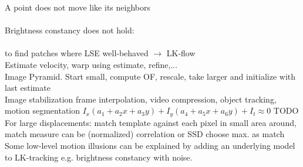 A point does not move like its neighbors \\
\\
Brightness constancy does not hold:\\
 \\
 to find patches where LSE well-behaved $\rightarrow$ LK-flow\\
 Estimate velocity, warp using estimate, refine,...\\
 Image Pyramid. Start small, compute OF, rescale, take larger and initialize with last estimate\\
 Image stabilization  frame interpolation, video compression, object tracking, motion segmentation
 $I_x(a_1 + a_2x + a_3y) + I_y(a_4 + a_5x + a_6y) + I_t \approx 0$ TODO\\
 For large displacements: match template against each pixel in small area around, match measure can be (normalized) correlation or SSD choose max. as match \\
 Some low-level motion illusions can be explained by adding an underlying model to LK-tracking e.g. brightness constancy with noise.
